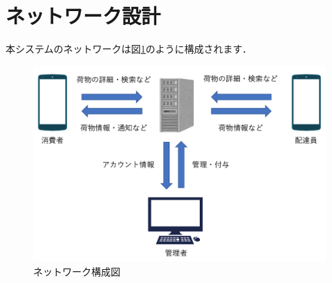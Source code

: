 \documentclass[a4j,titlepage]{jarticle}
\begin{document}
\section{ネットワーク設計}
本システムのネットワークは図\ref{fig:n_d}のように構成されます．

\begin{figure}[H]
 \begin{center}
  \includegraphics[width=140mm]{Network_Diagram.png}
  \caption{ネットワーク構成図}
  \label{fig:n_d}
 \end{center}

\end{figure}
\end{document}

